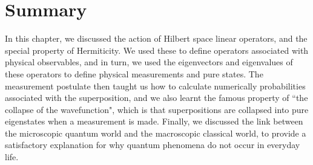 \section{Summary}
In this chapter, we discussed the action of Hilbert space linear operators, and the special property of Hermiticity. We used these to define operators associated with physical observables, and in turn, we used the eigenvectors and eigenvalues of these operators to define physical measurements and pure states. The measurement postulate then taught us how to calculate numerically probabilities associated with the superposition, and we also learnt the famous property of ``the collapse of the wavefunction", which is that superpositions are collapsed into pure eigenstates when a measurement is made. Finally, we discussed the link between the microscopic quantum world and the macroscopic classical world, to provide a satisfactory explanation for why quantum phenomena do not occur in everyday life.





